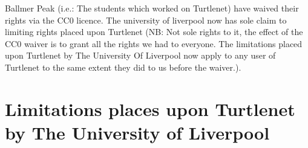 Ballmer Peak (i.e.: The students which worked on Turtlenet) have waived their
rights via the CC0 licence. The university of liverpool now has sole claim
to limiting rights placed upon Turtlenet (NB: Not sole rights to it, the effect
of the CC0 waiver is to grant all the rights we had to everyone. The limitations
placed upon Turtlenet by The University Of Liverpool now apply to any user of
Turtlenet to the same extent they did to us before the waiver.).

\section{Limitations places upon Turtlenet by The University of Liverpool}


